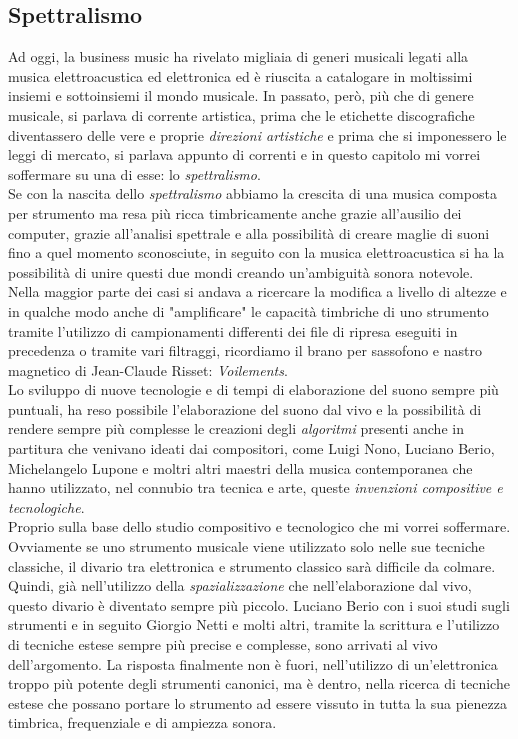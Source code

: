 \subsection{Spettralismo}
Ad oggi, la business music ha rivelato migliaia di generi musicali legati alla musica elettroacustica ed elettronica ed è riuscita a catalogare in moltissimi insiemi e sottoinsiemi il mondo musicale. In passato, però, più che di genere musicale, si parlava di corrente artistica, prima che le etichette discografiche diventassero delle vere e proprie \textit{direzioni artistiche} e prima che si imponessero le leggi di mercato, si parlava appunto di correnti e in questo capitolo mi vorrei soffermare su una di esse: lo  \textit{spettralismo}. \\
Se con la nascita dello \textit{spettralismo} abbiamo la crescita di una musica composta per strumento ma resa più ricca timbricamente anche grazie all’ausilio dei computer, grazie all’analisi spettrale e alla possibilità di creare maglie di suoni fino a quel momento sconosciute, in seguito con la musica elettroacustica si ha la possibilità di unire questi due mondi creando un’ambiguità sonora notevole. \\
Nella maggior parte dei casi si andava a ricercare la modifica a livello di altezze e in qualche modo anche di "amplificare" le capacità timbriche di uno strumento tramite l’utilizzo di campionamenti differenti dei file di ripresa eseguiti in precedenza o tramite vari filtraggi, ricordiamo il brano per sassofono e nastro magnetico di Jean-Claude Risset: \textit{Voilements}. \\
Lo sviluppo di nuove tecnologie e di tempi di elaborazione del suono sempre più puntuali, ha reso possibile l'elaborazione del suono dal vivo e la possibilità di rendere sempre più complesse le creazioni degli \textit{algoritmi} presenti anche in partitura che venivano ideati dai compositori, come Luigi Nono, Luciano Berio, Michelangelo Lupone e moltri altri maestri della musica contemporanea che hanno utilizzato, nel connubio tra tecnica e arte, queste \textit{invenzioni compositive e tecnologiche}. \\
Proprio sulla base dello studio compositivo e tecnologico che mi vorrei soffermare. Ovviamente se uno strumento musicale viene utilizzato solo nelle sue tecniche classiche, il divario tra elettronica e strumento classico sarà difficile da colmare. Quindi, già nell’utilizzo della \textit{spazializzazione} che nell’elaborazione dal vivo, questo divario è diventato sempre più piccolo. Luciano Berio con i suoi studi sugli strumenti e in seguito Giorgio Netti e molti altri, tramite la scrittura e l’utilizzo di tecniche estese sempre più precise e complesse, sono arrivati al vivo dell’argomento. La risposta finalmente non è fuori, nell’utilizzo di un’elettronica troppo più potente degli strumenti canonici, ma è dentro, nella ricerca di tecniche estese che possano portare lo strumento ad essere vissuto in tutta la sua pienezza timbrica, frequenziale e di ampiezza sonora. 

